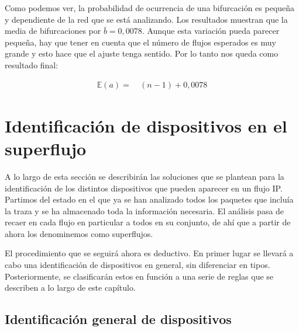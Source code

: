 \documentclass[tfg,epsbased,lof,lot,loa,final,nocopyright,overleaf]{tfgtfmthesisuam}
\begin{document}
Como podemos ver, la probabilidad de ocurrencia de una bifurcación es pequeña y dependiente de la red que se está analizando. Los resultados muestran que la media de bifurcaciones por $\bar{b} = 0,0078$. Aunque esta variación pueda parecer pequeña, hay que tener en cuenta que el número de flujos esperados es muy grande y esto hace que el ajuste tenga sentido. Por lo tanto nos queda como resultado final:

\begin{align*}
 \mathbb{E}(a) =&\ (n - 1) + 0,0078
\end{align*}

\section{Identificación de dispositivos en el superflujo}
\label{sec:Analisis:Dispositivos}
A lo largo de esta sección se describirán las soluciones que se plantean para la identificación de los distintos dispositivos que pueden aparecer en un flujo IP. Partimos del estado en el que ya se han analizado todos los paquetes que incluía la traza y se ha almacenado toda la información necesaria. El análisis pasa de recaer en cada flujo en particular a todos en su conjunto, de ahí que a partir de ahora los denominemos como superflujos.

El procedimiento que se seguirá ahora es deductivo. En primer lugar se llevará a cabo una identificación de dispositivos en general, sin diferenciar en tipos. Posteriormente, se clasificarán estos en función a una serie de reglas que se describen a lo largo de este capítulo.

\subsection{Identificación general de dispositivos}
\end{document}
